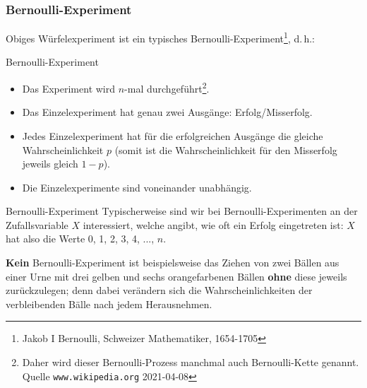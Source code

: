 \newpage


\subsubsection{Bernoulli-Experiment}
Obiges Würfelexperiment ist ein typisches
Bernoulli-Experiment\footnote{Jakob I Bernoulli, Schweizer Mathematiker,
  1654-1705}, d.\,h.:

\begin{definition}{Bernoulli-Experiment}{}
\begin{itemize}
\item Das Experiment wird $n$-mal durchgeführt\footnote{Daher wird dieser
Bernoulli-Prozess manchmal auch Bernoulli-Kette genannt. Quelle
\texttt{www.wikipedia.org} 2021-04-08}.
\item Das Einzelexperiment hat genau zwei Ausgänge: Erfolg/Misserfolg.
\item Jedes Einzelexperiment hat für die erfolgreichen Ausgänge die gleiche
      Wahrscheinlichkeit $p$ (somit ist die Wahrscheinlichkeit für den
      Misserfolg jeweils gleich $1-p$).
\item Die Einzelexperimente sind voneinander unabhängig.
\end{itemize}
\end{definition}

\begin{bemerkung}{Bernoulli-Experiment}{}
Typischerweise sind wir bei Bernoulli-Experimenten an der
Zufallsvariable $X$ interessiert, welche angibt, wie oft ein Erfolg
eingetreten ist: $X$ hat also die Werte 0, 1, 2, 3, 4, ..., $n$.
\end{bemerkung}

\textbf{Kein} Bernoulli-Experiment ist beispielsweise das Ziehen von zwei Bällen aus
einer Urne mit drei gelben und sechs orangefarbenen Bällen \textbf{ohne} diese
jeweils zurückzulegen; denn dabei verändern sich die
Wahrscheinlichkeiten der verbleibenden Bälle nach jedem Herausnehmen.
\newpage


